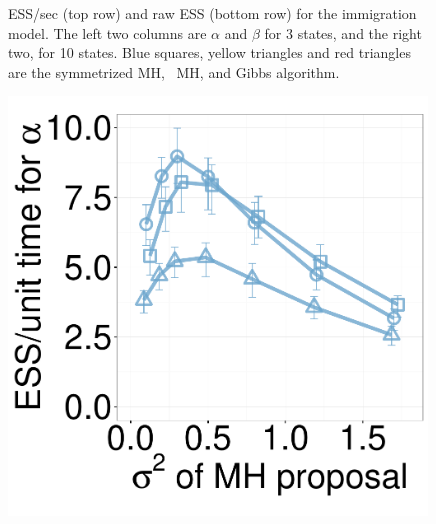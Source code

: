 \begin{figure}[H]
\begin{minipage}[hp]{0.24\linewidth}
	\end{minipage}
    \caption{ESS/sec (top row) and raw ESS (bottom row) for the immigration model. The left two columns are $\alpha$ and $\beta$ for 3 states, and the right two, for 10 states.
    Blue squares, yellow triangles and red triangles are the symmetrized MH, \naive\ MH, and Gibbs algorithm. }
     \label{fig:ESS_Q_D10}
  \end{figure}

  \begin{figure}[H]
  \centering
  \begin{minipage}[!hp]{0.24\linewidth}
  \centering
    \includegraphics [width=0.99\textwidth, angle=0]{figs/new_whole_exp_figs/mh_q_alpha_dim3.pdf}
\end{minipage}
  \begin{minipage}[hp]{0.24\linewidth}
  \centering

\end{minipage}
\end{figure}
